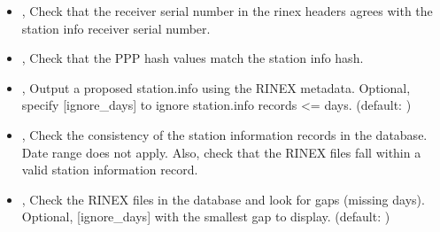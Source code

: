 \documentclass[letterpaper,10pt,english]{sphinxmanual}
\begin{document}
\begin{itemize}
\item {} 
\sphinxAtStartPar
{\hyperref[\detokenize{pgamit.com:IntegrityCheck.py--stnr}]{}}, {\hyperref[\detokenize{pgamit.com:IntegrityCheck.py---station_info_rinex}]{}} \sphinxhyphen{} Check that the receiver serial number in the rinex headers agrees with the station info receiver serial number.

\item {} 
\sphinxAtStartPar
{\hyperref[\detokenize{pgamit.com:IntegrityCheck.py--stns}]{}}, {\hyperref[\detokenize{pgamit.com:IntegrityCheck.py---station_info_solutions}]{}} \sphinxhyphen{} Check that the PPP hash values match the station info hash.

\item {} 
\sphinxAtStartPar
{\hyperref[\detokenize{pgamit.com:IntegrityCheck.py--stnp}]{}} , {\hyperref[\detokenize{pgamit.com:IntegrityCheck.py---station_info_proposed}]{}}  \sphinxhyphen{} Output a proposed station.info using the RINEX metadata. Optional, specify {[}ignore\_days{]} to ignore station.info records \textless{}= days. (default: )

\item {} 
\sphinxAtStartPar
{\hyperref[\detokenize{pgamit.com:IntegrityCheck.py--stnc}]{}}, {\hyperref[\detokenize{pgamit.com:IntegrityCheck.py---station_info_check}]{}} \sphinxhyphen{} Check the consistency of the station information records in the database. Date range does not apply. Also, check that the RINEX files fall within a valid station information record.

\item {} 
\sphinxAtStartPar
{\hyperref[\detokenize{pgamit.com:IntegrityCheck.py--g}]{}} , {\hyperref[\detokenize{pgamit.com:IntegrityCheck.py---data_gaps}]{}}  \sphinxhyphen{} Check the RINEX files in the database and look for gaps (missing days). Optional, {[}ignore\_days{]} with the smallest gap to display. (default: )


\end{itemize}
\end{document}
